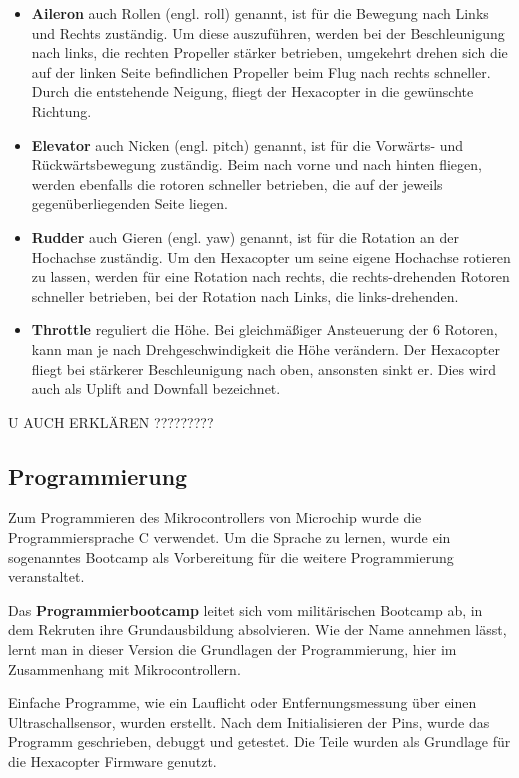     \begin{itemize}
      \item \textbf{Aileron} auch Rollen (engl. roll) genannt, ist für die Bewegung nach Links und Rechts zuständig.
      Um diese auszuführen, werden bei der Beschleunigung nach links, die rechten Propeller stärker betrieben, umgekehrt drehen sich die auf der linken Seite befindlichen Propeller beim Flug nach rechts schneller. Durch die entstehende Neigung, fliegt der Hexacopter in die gewünschte Richtung.
      \item \textbf{Elevator} auch Nicken (engl. pitch) genannt, ist für die Vorwärts- und Rückwärtsbewegung zuständig.
      Beim nach vorne und nach hinten fliegen, werden ebenfalls die rotoren schneller betrieben, die auf der jeweils gegenüberliegenden Seite liegen.
      \item \textbf{Rudder} auch Gieren (engl. yaw) genannt, ist für die Rotation an der Hochachse zuständig.
      Um den Hexacopter um seine eigene Hochachse rotieren zu lassen, werden für eine Rotation nach rechts, die rechts-drehenden Rotoren schneller betrieben, bei der Rotation nach Links, die links-drehenden.
      \item \textbf{Throttle} reguliert die Höhe.
      Bei gleichmäßiger Ansteuerung der 6 Rotoren, kann man je nach Drehgeschwindigkeit die Höhe verändern. Der Hexacopter fliegt bei stärkerer Beschleunigung nach oben, ansonsten sinkt er. Dies wird auch als Uplift and Downfall bezeichnet.
    \end{itemize}

    U AUCH ERKLÄREN ?????????



  \subsection{Programmierung}
  Zum Programmieren des Mikrocontrollers von Microchip wurde die Programmiersprache C verwendet.
  Um die Sprache zu lernen, wurde ein sogenanntes Bootcamp als Vorbereitung für die weitere Programmierung veranstaltet.

  Das \textbf{Programmierbootcamp} leitet sich vom militärischen Bootcamp ab, in dem Rekruten ihre Grundausbildung absolvieren. Wie der Name annehmen lässt, lernt man in dieser Version die Grundlagen der Programmierung, hier im Zusammenhang mit Mikrocontrollern.

  Einfache Programme, wie ein Lauflicht oder Entfernungsmessung über einen Ultraschallsensor, wurden erstellt.
  Nach dem Initialisieren der Pins, wurde das Programm geschrieben, debuggt und getestet.
  Die Teile wurden als Grundlage für die Hexacopter Firmware genutzt.

